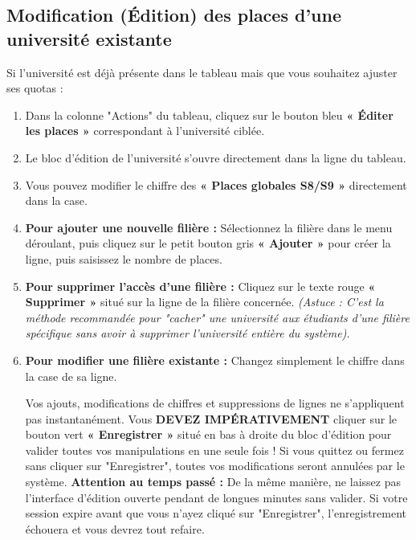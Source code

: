 \documentclass[12pt,a4paper]{article}
\begin{document}
\subsection{Modification (Édition) des places d'une université existante}
Si l'université est déjà présente dans le tableau mais que vous souhaitez ajuster ses quotas :
\begin{enumerate}
    \item Dans la colonne "Actions" du tableau, cliquez sur le bouton bleu \textbf{« Éditer les places »} correspondant à l'université ciblée.
    \item Le bloc d'édition de l'université s'ouvre directement dans la ligne du tableau.
    \item Vous pouvez modifier le chiffre des \textbf{« Places globales S8/S9 »} directement dans la case.
    \item \textbf{Pour ajouter une nouvelle filière :} Sélectionnez la filière dans le menu déroulant, puis cliquez sur le petit bouton gris \textbf{« Ajouter »} pour créer la ligne, puis saisissez le nombre de places.
    \item \textbf{Pour supprimer l'accès d'une filière :} Cliquez sur le texte rouge \textbf{« Supprimer »} situé sur la ligne de la filière concernée.
    \newline \textit{(Astuce : C'est la méthode recommandée pour "cacher" une université aux étudiants d'une filière spécifique sans avoir à supprimer l'université entière du système).}
    \item \textbf{Pour modifier une filière existante :} Changez simplement le chiffre dans la case de sa ligne.
    \begin{tcolorbox}[colback=red!5!white,colframe=red!75!black,title=⚠️ ENREGISTREMENT FINAL OBLIGATOIRE ET RISQUE D'EXPIRATION]
    Vos ajouts, modifications de chiffres et suppressions de lignes ne s'appliquent pas instantanément. Vous \textbf{DEVEZ IMPÉRATIVEMENT} cliquer sur le bouton vert \textbf{« Enregistrer »} situé en bas à droite du bloc d'édition pour valider toutes vos manipulations en une seule fois ! Si vous quittez ou fermez sans cliquer sur "Enregistrer", toutes vos modifications seront annulées par le système.
    \newline \textbf{Attention au temps passé :} De la même manière, ne laissez pas l'interface d'édition ouverte pendant de longues minutes sans valider. Si votre session expire avant que vous n'ayez cliqué sur "Enregistrer", l'enregistrement échouera et vous devrez tout refaire.
    \end{tcolorbox}
\end{enumerate}
\end{document}

